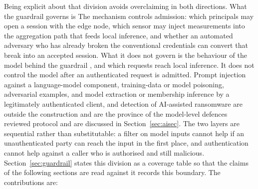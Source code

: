 \documentclass[cmc,article,submit,moreauthors,pdftex]{Definitions/tsp}
\providecommand{\DIFadd}[1]{{\protect\color{blue} \sf #1}} %
\providecommand{\DIFdel}[1]{{\protect\color{red} \scriptsize #1}} %
\providecommand{\DIFaddbegin}{} %
\providecommand{\DIFaddend}{} %
\providecommand{\DIFdelbegin}{} %
\providecommand{\DIFdelend}{} %
\begin{document}
\DIFdelbegin \DIFdel{Being explicit about that division avoids overclaiming in both directions. What the guardrail governs is }\DIFdelend \DIFaddbegin \DIFadd{The mechanism controls }\DIFaddend admission: which principals may open a session\DIFdelbegin \DIFdel{with the edge node}\DIFdelend , which sensor may inject measurements\DIFdelbegin \DIFdel{into the aggregation path that feeds local inference, and whether an automated adversary who has already broken the conventional credentials can convert that break into an accepted session. What it does not govern is the behaviour of the model behind the guardrail}\DIFdelend \DIFaddbegin \DIFadd{, and which requests reach local inference. It does not control the model after an authenticated request is admitted}\DIFaddend . Prompt injection\DIFdelbegin \DIFdel{against a language-model component}\DIFdelend , training-data or model poisoning, adversarial examples, \DIFaddbegin \DIFadd{and }\DIFaddend model extraction or membership inference \DIFdelbegin \DIFdel{by a legitimately authenticated client, and detection of AI-assisted ransomware }\DIFdelend are outside the \DIFdelbegin \DIFdel{construction and are the province of the model-level defences reviewed }\DIFdelend \DIFaddbegin \DIFadd{protocol and are discussed }\DIFaddend in Section~\ref{sec:aisec}. \DIFdelbegin \DIFdel{The two layers are sequential rather than substitutable: a filter on model inputs cannot help if an unauthenticated party can reach the input in the first place, and authentication cannot help against a caller who is authorised and still malicious. }\DIFdelend Section~\ref{sec:guardrail} \DIFdelbegin \DIFdel{states this division as a coverage table so that the claims of the following sections are read against it}\DIFdelend \DIFaddbegin \DIFadd{records this boundary}\DIFaddend . The contributions are:
\end{document}
